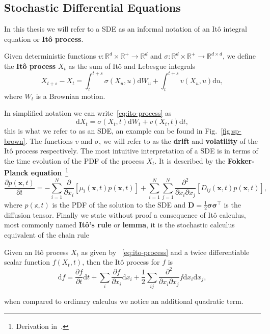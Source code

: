 \subsection{Stochastic Differential Equations}
In this thesis we will refer to a SDE as an informal notation of an It\^ o integral equation or \textbf{It\^ o process}. 
\begin{definition}[It\^ o process]
	Given deterministic functions $v: \mathbb{R}^{d} \times \mathbb{R}^{+} \rightarrow \mathbb{R}^{d}$ and $\sigma: \mathbb{R}^{d} \times \mathbb{R}^{+} \rightarrow \mathbb{R}^{d \times d}$, we define the \textbf{It\^ o process} $X_t$ as the sum of It\^ o and Lebesgue integrals
	\begin{equation}
		\label{eq:ito-process}
		X_{t+s}-X_{t}=\int_{t}^{t+s} \sigma\left(X_{u}, u\right) \mathrm{d} W_{u} + \int_{t}^{t+s} v\left(X_{u}, u\right) \mathrm{d} u,
	\end{equation}
	where $W_t$ is a Brownian motion.
\end{definition}
In simplified notation we can write~\eqref{eq:ito-process} as
\begin{equation}
	\label{eq:SDE_general}
	\mathrm{d} X_t = \sigma \left(X_{t}, t\right)\mathrm{d}W_t + v\left(X_{t}, t\right) \mathrm{d}t,
\end{equation}
this is what we refer to as an SDE, an example can be found in Fig.~\ref{fig:sp-brown}. The functions $v$ and $\sigma$, we will refer to as the \textbf{drift} and \textbf{volatility} of the It\^ o process respectively. The most intuitive interpretation of a SDE is in terms of the time evolution of the PDF of the process $X_t$. It is described by the \textbf{Fokker-Planck equation}~\footnote{Derivation in~\cite{sarkka2019applied}.} 
\begin{equation}
	\label{eq:Fokker-Planck-General}
	\frac{\partial p(\mathbf{x}, t)}{\partial t}=
	-\sum_{i=1}^{N} \frac{\partial}{\partial x_{i}}\left[\mu_{i}(\mathbf{x}, t) p(\mathbf{x}, t)\right]
	+\sum_{i=1}^{N} \sum_{j=1}^{N} \frac{\partial^{2}}{\partial x_{i} \partial x_{j}}\left[D_{i j}(\mathbf{x}, t) p(\mathbf{x}, t)\right],
\end{equation}
where $p(\mathbb{x}, t)$ is the PDF of the solution to the SDE and $\mathbf{D}=\frac{1}{2} \boldsymbol{\sigma} \boldsymbol{\sigma}^{\top}$ is the diffusion tensor. Finally we state without proof a consequence of It\^ o calculus, most commonly named \textbf{It\^ o's rule} or \textbf{lemma}, it is the stochastic calculus equivalent of the chain rule
\begin{lemma}[It\^ o's lemma]
	Given an It\^ o process $X_t$ as given by ~\eqref{eq:ito-process} and a twice differentiable scalar function $f(X_t, t)$, then the It\^ o process for $f$ is
	\begin{equation}
		\label{eq:ito_lemma}
		\mathrm{d} f = \frac{\partial f}{\partial t}\mathrm{d}t + \sum_i \frac{\partial f}{\partial x_i} \mathrm{d}x_i + \frac{1}{2}\sum_{ij} \frac{\partial^{2}}{\partial x_{i} \partial x_{j}} f \mathrm{d}x_i \mathrm{d}x_j,
	\end{equation}
\end{lemma}
when compared to ordinary calculus we notice an additional quadratic term.

